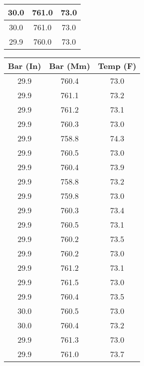 \documentclass[conf]{new-aiaa}
\begin{document}
\begin{table}[ht]
\begin{minipage}{0.32\textwidth}
\begin{tabular}{||c c c||}
             \hline
             30.0 & 761.0 & 73.0 \\
             \hline
             30.0 & 761.0 & 73.0 \\
             \hline
             29.9 & 760.0 & 73.0 \\
             \hline
        \end{tabular}
    \end{minipage}
    \hfill
    \begin{minipage}{0.32\textwidth}
        \centering
        \begin{tabular}{||c c c||}
            \hline
            Bar (In) & Bar (Mm) & Temp (F)  \\ [0.5ex]
            \hline\hline
             29.9 & 760.4 & 73.0 \\
             \hline
             29.9 & 761.1 & 73.2 \\
             \hline
             29.9 & 761.2 & 73.1 \\
             \hline
             29.9 & 760.3 & 73.0 \\
             \hline
             29.9 & 758.8 & 74.3 \\
             \hline
             29.9 & 760.5 & 73.0 \\
             \hline
             29.9 & 760.4 & 73.9 \\
             \hline
             29.9 & 758.8 & 73.2 \\
             \hline
             29.9 & 759.8 & 73.0 \\
             \hline
             29.9 & 760.3 & 73.4 \\
             \hline
             29.9 & 760.5 & 73.1 \\
             \hline
             29.9 & 760.2 & 73.5 \\
             \hline
             29.9 & 760.2 & 73.0 \\
             \hline
             29.9 & 761.2 & 73.1 \\
             \hline
             29.9 & 761.5 & 73.0 \\
             \hline
             29.9 & 760.4 & 73.5 \\
             \hline
             30.0 & 760.5 & 73.0 \\
             \hline
             30.0 & 760.4 & 73.2 \\
             \hline
             29.9 & 761.3 & 73.0 \\
             \hline
             29.9 & 761.0 & 73.7 \\

\end{tabular}
\end{minipage}
\end{table}
\end{document}
